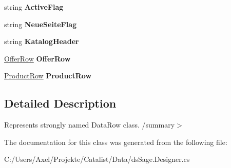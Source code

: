\begin{DoxyCompactItemize}
\item 
string {\bfseries Active\+Flag}\hypertarget{class_products_1_1_data_1_1ds_sage_1_1_offer_detail_row_abaf101bd950c5d8c491370f8d970798d}{}\label{class_products_1_1_data_1_1ds_sage_1_1_offer_detail_row_abaf101bd950c5d8c491370f8d970798d}

\item 
string {\bfseries Neue\+Seite\+Flag}\hypertarget{class_products_1_1_data_1_1ds_sage_1_1_offer_detail_row_af02236db7984c455d3589b9aba221c43}{}\label{class_products_1_1_data_1_1ds_sage_1_1_offer_detail_row_af02236db7984c455d3589b9aba221c43}

\item 
string {\bfseries Katalog\+Header}\hypertarget{class_products_1_1_data_1_1ds_sage_1_1_offer_detail_row_a595d8d88e72faf658430b209f13b4548}{}\label{class_products_1_1_data_1_1ds_sage_1_1_offer_detail_row_a595d8d88e72faf658430b209f13b4548}

\item 
\hyperlink{class_products_1_1_data_1_1ds_sage_1_1_offer_row}{Offer\+Row} {\bfseries Offer\+Row}\hypertarget{class_products_1_1_data_1_1ds_sage_1_1_offer_detail_row_a4a6cda50d56f2b89a1d69f4666684288}{}\label{class_products_1_1_data_1_1ds_sage_1_1_offer_detail_row_a4a6cda50d56f2b89a1d69f4666684288}

\item 
\hyperlink{class_products_1_1_data_1_1ds_sage_1_1_product_row}{Product\+Row} {\bfseries Product\+Row}\hypertarget{class_products_1_1_data_1_1ds_sage_1_1_offer_detail_row_a17e6afe9a183c762b065ae240ce6f70f}{}\label{class_products_1_1_data_1_1ds_sage_1_1_offer_detail_row_a17e6afe9a183c762b065ae240ce6f70f}

\end{DoxyCompactItemize}


\subsection{Detailed Description}
Represents strongly named Data\+Row class. /summary$>$ 

The documentation for this class was generated from the following file\+:\begin{DoxyCompactItemize}
\item 
C\+:/\+Users/\+Axel/\+Projekte/\+Catalist/\+Data/ds\+Sage.\+Designer.\+cs\end{DoxyCompactItemize}
